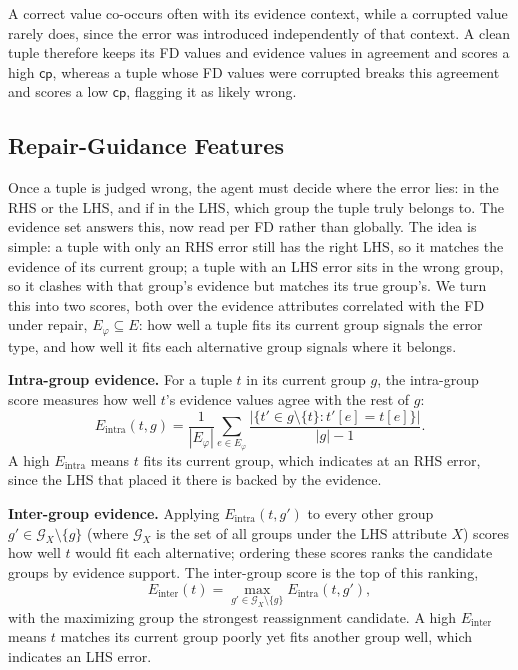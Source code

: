 \documentclass[sigconf]{acmart}
\begin{document}
A correct value co-occurs often with its evidence context, while a corrupted value rarely does, since the error was introduced independently of that context. A clean tuple therefore keeps its FD values and evidence values in agreement and scores a high $\textsf{cp}$, whereas a tuple whose FD values were corrupted breaks this agreement and scores a low $\textsf{cp}$, flagging it as likely wrong.


\subsection{Repair-Guidance Features}
\label{sec:evidence}

Once a tuple is judged wrong, the agent must decide where the error lies: in the RHS or the LHS, and if in the LHS, which group the tuple truly belongs to. The evidence set answers this, now read per FD rather than globally. The idea is simple: a tuple with only an RHS error still has the right LHS, so it matches the evidence of its current group; a tuple with an LHS error sits in the wrong group, so it clashes with that group's evidence but matches its true group's. We turn this into two scores, both over the evidence attributes correlated with the FD under repair, $E_\varphi \subseteq E$: how well a tuple fits its current group signals the error type, and how well it fits each alternative group signals where it belongs.

\noindent\textbf{Intra-group evidence.}
For a tuple $t$ in its current group $g$, the intra-group score measures how well $t$'s evidence values agree with the rest of $g$:
\begin{equation}
E_{\text{intra}}(t, g) =
\frac{1}{|E_\varphi|} \sum_{e \in E_\varphi}
\frac{|\{t' \in g \setminus \{t\} : t'[e] = t[e]\}|}{|g| - 1}.
\end{equation}
A high $E_{\text{intra}}$ means $t$ fits its current group, which indicates at an RHS error, since the LHS that placed it there is backed by the evidence.

\noindent\textbf{Inter-group evidence.}
Applying $E_{\text{intra}}(t, g')$ to every other group $g' \in \mathcal{G}_X \setminus \{g\}$ (where $\mathcal{G}_X$ is the set of all groups under the LHS attribute $X$) scores how well $t$ would fit each alternative; ordering these scores ranks the candidate groups by evidence support. The inter-group score is the top of this ranking,
\begin{equation}
E_{\text{inter}}(t) =
\max_{g' \in \mathcal{G}_X \setminus \{g\}} E_{\text{intra}}(t, g'),
\end{equation}
with the maximizing group the strongest reassignment candidate. A high $E_{\text{inter}}$ means $t$ matches its current group poorly yet fits another group well, which indicates an LHS error.
\end{document}
